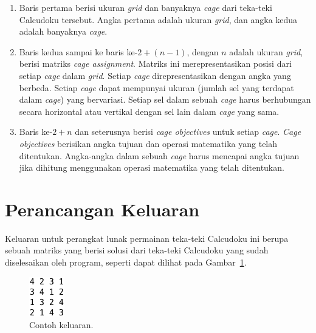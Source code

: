 \begin{enumerate}
\item Baris pertama berisi ukuran \textit{grid} dan banyaknya \textit{cage} dari teka-teki Calcudoku tersebut. Angka pertama adalah ukuran \textit{grid}, dan angka kedua adalah banyaknya \textit{cage}.
\item Baris kedua sampai ke baris ke-\begin{math}2 + (n - 1)\end{math}, dengan \begin{math}n\end{math} adalah ukuran \textit{grid}, berisi matriks \textit{cage assignment}. Matriks ini merepresentasikan posisi dari setiap \textit{cage} dalam \textit{grid}. Setiap \textit{cage} direpresentasikan dengan angka yang berbeda. Setiap \textit{cage} dapat mempunyai ukuran (jumlah sel yang terdapat dalam \textit{cage}) yang bervariasi. Setiap sel dalam sebuah \textit{cage} harus berhubungan secara horizontal atau vertikal dengan sel lain dalam \textit{cage} yang sama.
\item Baris ke-\begin{math}2 + n\end{math} dan seterusnya berisi \textit{cage objectives} untuk setiap \textit{cage}. \textit{Cage objectives} berisikan angka tujuan dan operasi matematika yang telah ditentukan. Angka-angka dalam sebuah \textit{cage} harus mencapai angka tujuan jika dihitung menggunakan operasi matematika yang telah ditentukan.
\end{enumerate}

\section{Perancangan Keluaran}
\label{sec:perancangankeluaran}

Keluaran untuk perangkat lunak permainan teka-teki Calcudoku ini berupa sebuah matriks yang berisi solusi dari teka-teki Calcudoku yang sudah diselesaikan oleh program, seperti dapat dilihat pada Gambar~\ref{fig:perancangankeluaran}.

\begin{figure}
\centering
\captionsetup{justification=centering}
\includegraphics[scale=1]{Gambar/Perancangan/PerancanganOutput.png}
\caption[Contoh keluaran.]{Contoh keluaran.}
\label{fig:perancangankeluaran}
\end{figure}

